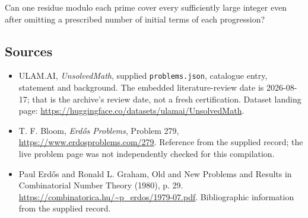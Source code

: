 \documentclass[11pt,a4paper]{article}
\begin{document}
Can one residue modulo each prime cover every sufficiently large integer even after omitting a prescribed number of initial terms of each progression?

\subsection{Sources}

{\small

\begin{itemize}

\item[\hypertarget{source:statement:1}{S1}] ULAM.AI, \emph{UnsolvedMath}, supplied \texttt{problems.json}, catalogue entry, statement and background. The embedded literature-review date is 2026-08-17; that is the archive’s review date, not a fresh certification. Dataset landing page: \url{https://huggingface.co/datasets/ulamai/UnsolvedMath}.

\item[\hypertarget{source:statement:2}{S2}] T. F. Bloom, \emph{Erdős Problems}, Problem 279, \url{https://www.erdosproblems.com/279}. Reference from the supplied record; the live problem page was not independently checked for this compilation.

\item[\hypertarget{source:statement:3}{S3}] Paul Erdős and Ronald L. Graham, Old and New Problems and Results in Combinatorial Number Theory (1980), p. 29. \url{https://combinatorica.hu/~p_erdos/1979-07.pdf}. Bibliographic information from the supplied record.

\end{itemize}

}

\label{end:statement}
\end{document}
